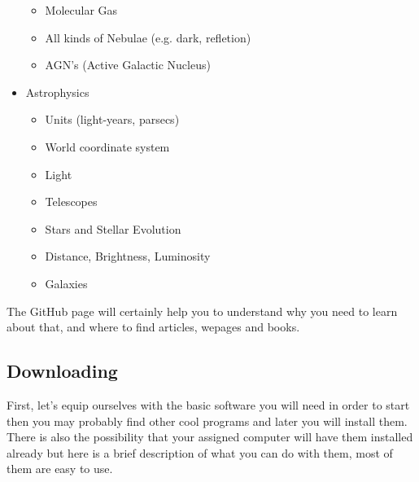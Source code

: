 \documentclass[11pt,fleqn]{book} %
\begin{document}
\begin{itemize}
\begin{itemize}
																																																				            \item Molecular Gas
																																																					                \item All kinds of Nebulae (e.g. dark, refletion)
																																																							            \item AGN's (Active Galactic Nucleus)
																																																								            \end{itemize}
																																																									        \item Astrophysics
																																																										    	\begin{itemize}
																																																											        	\item Units (light-years, parsecs)
																																																													            \item World coordinate system
																																																														            	\item Light
																																																																            \item Telescopes
																																																																	                \item Stars and Stellar Evolution
																																																																			            \item Distance, Brightness, Luminosity
																																																																				                \item Galaxies
																																																																						        \end{itemize}
																																																																							\end{itemize}
																																																																							The GitHub page will certainly help you to understand why you need to learn about that, and where to find articles, wepages and books.
																																																																							\subsection{Downloading}
																																																																							First, let's equip ourselves with the basic software you will need in order to start then you may probably find other cool programs and later you will install them. There is also the possibility that your assigned computer will have them installed already but here is a brief description of what you can do with them, most of them are easy to use.
\end{document}

